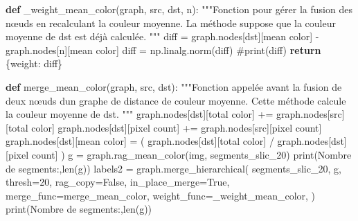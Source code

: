 \documentclass[
  french,
  11pt,
  letterpaper,
  open=any,
  twoside=false,
  french]{scrbook}
\newenvironment{Shaded}{\begin{snugshade}}{\end{snugshade}}
\newcommand{\BuiltInTok}[1]{\textcolor[rgb]{0.00,0.23,0.31}{#1}}
\newcommand{\CommentTok}[1]{\textcolor[rgb]{0.37,0.37,0.37}{#1}}
\newcommand{\ControlFlowTok}[1]{\textcolor[rgb]{0.00,0.23,0.31}{\textbf{#1}}}
\newcommand{\DecValTok}[1]{\textcolor[rgb]{0.68,0.00,0.00}{#1}}
\newcommand{\KeywordTok}[1]{\textcolor[rgb]{0.00,0.23,0.31}{\textbf{#1}}}
\newcommand{\NormalTok}[1]{\textcolor[rgb]{0.00,0.23,0.31}{#1}}
\newcommand{\OperatorTok}[1]{\textcolor[rgb]{0.37,0.37,0.37}{#1}}
\newcommand{\StringTok}[1]{\textcolor[rgb]{0.13,0.47,0.30}{#1}}
\newcommand{\VariableTok}[1]{\textcolor[rgb]{0.07,0.07,0.07}{#1}}
\begin{document}
\begin{Shaded}
\begin{Highlighting}[]
\KeywordTok{def}\NormalTok{ \_weight\_mean\_color(graph, src, dst, n):}
    \CommentTok{"""Fonction pour gérer la fusion des nœuds en recalculant la couleur moyenne.}
\CommentTok{    La méthode suppose que la couleur moyenne de \textasciigrave{}dst\textasciigrave{} est déjà calculée.}
\CommentTok{    """}
\NormalTok{    diff }\OperatorTok{=}\NormalTok{ graph.nodes[dst][}\StringTok{\textquotesingle{}mean color\textquotesingle{}}\NormalTok{] }\OperatorTok{{-}}\NormalTok{ graph.nodes[n][}\StringTok{\textquotesingle{}mean color\textquotesingle{}}\NormalTok{]}
\NormalTok{    diff }\OperatorTok{=}\NormalTok{ np.linalg.norm(diff)}
    \CommentTok{\#print(diff)}
    \ControlFlowTok{return}\NormalTok{ \{}\StringTok{\textquotesingle{}weight\textquotesingle{}}\NormalTok{: diff\}}


\KeywordTok{def}\NormalTok{ merge\_mean\_color(graph, src, dst):}
    \CommentTok{"""Fonction appelée avant la fusion de deux nœuds d\textquotesingle{}un graphe de distance de couleur moyenne.}
\CommentTok{      Cette méthode calcule la couleur moyenne de \textasciigrave{}dst\textasciigrave{}.}
\CommentTok{    """}
\NormalTok{    graph.nodes[dst][}\StringTok{\textquotesingle{}total color\textquotesingle{}}\NormalTok{] }\OperatorTok{+=}\NormalTok{ graph.nodes[src][}\StringTok{\textquotesingle{}total color\textquotesingle{}}\NormalTok{]}
\NormalTok{    graph.nodes[dst][}\StringTok{\textquotesingle{}pixel count\textquotesingle{}}\NormalTok{] }\OperatorTok{+=}\NormalTok{ graph.nodes[src][}\StringTok{\textquotesingle{}pixel count\textquotesingle{}}\NormalTok{]}
\NormalTok{    graph.nodes[dst][}\StringTok{\textquotesingle{}mean color\textquotesingle{}}\NormalTok{] }\OperatorTok{=}\NormalTok{ (}
\NormalTok{        graph.nodes[dst][}\StringTok{\textquotesingle{}total color\textquotesingle{}}\NormalTok{] }\OperatorTok{/}\NormalTok{ graph.nodes[dst][}\StringTok{\textquotesingle{}pixel count\textquotesingle{}}\NormalTok{]}
\NormalTok{    )}
\NormalTok{g }\OperatorTok{=}\NormalTok{ graph.rag\_mean\_color(img, segments\_slic\_20)}
\BuiltInTok{print}\NormalTok{(}\StringTok{\textquotesingle{}Nombre de segments:\textquotesingle{}}\NormalTok{,}\BuiltInTok{len}\NormalTok{(g))}
\NormalTok{labels2 }\OperatorTok{=}\NormalTok{ graph.merge\_hierarchical(}
\NormalTok{    segments\_slic\_20,}
\NormalTok{    g,}
\NormalTok{    thresh}\OperatorTok{=}\DecValTok{20}\NormalTok{,}
\NormalTok{    rag\_copy}\OperatorTok{=}\VariableTok{False}\NormalTok{,}
\NormalTok{    in\_place\_merge}\OperatorTok{=}\VariableTok{True}\NormalTok{,}
\NormalTok{    merge\_func}\OperatorTok{=}\NormalTok{merge\_mean\_color,}
\NormalTok{    weight\_func}\OperatorTok{=}\NormalTok{\_weight\_mean\_color,}
\NormalTok{)}
\BuiltInTok{print}\NormalTok{(}\StringTok{\textquotesingle{}Nombre de segments:\textquotesingle{}}\NormalTok{,}\BuiltInTok{len}\NormalTok{(g))}


\end{Highlighting}
\end{Shaded}
\end{document}
